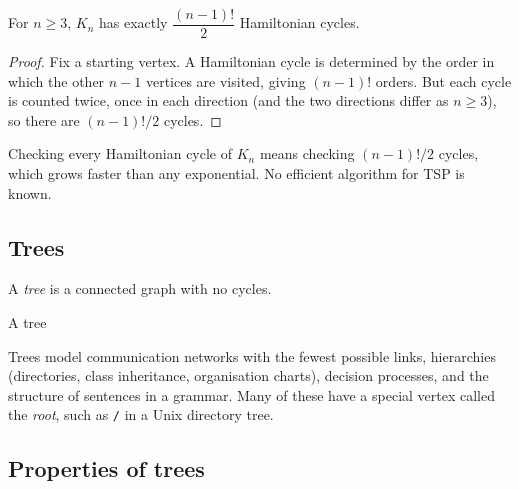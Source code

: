 \begin{proposition}
For $n\ge3$, $K_n$ has exactly $\dfrac{(n-1)!}{2}$ Hamiltonian cycles.
\end{proposition}
\begin{proof}
Fix a starting vertex. A Hamiltonian cycle is determined by the order in which the other $n-1$ vertices are visited, giving $(n-1)!$ orders. But each cycle is counted twice, once in each direction (and the two directions differ as $n\ge3$), so there are $(n-1)!/2$ cycles.
\end{proof}

\begin{note}
Checking every Hamiltonian cycle of $K_n$ means checking $(n-1)!/2$ cycles, which grows faster than any exponential. No efficient algorithm for TSP is known.
\end{note}

\subsection{Trees}
\label{sec:12-1}

\begin{definition}[Tree]
A \emph{tree} is a connected graph with no cycles.
\end{definition}

\begin{center}
\end{center}
\begin{center}
\small A tree
\end{center}

\begin{note}
Trees model communication networks with the fewest possible links, hierarchies (directories, class inheritance, organisation charts), decision processes, and the structure of sentences in a grammar. Many of these have a special vertex called the \emph{root}, such as \texttt{/} in a Unix directory tree.
\end{note}

\subsection{Properties of trees}
\label{sec:12-2}

